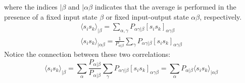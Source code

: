 where the indices $|\beta$ and $|\alpha\beta$ indicates that the average is performed in the presence of a fixed input state $\beta$ or fixed input-output state $\alpha\beta$, respectively.
\begin{gather}
{\langle s_is_k\rangle}_{|\beta}=\sum_{\alpha,\gamma}P_{\alpha\gamma|\beta}{[s_is_k]}_{\alpha\gamma\beta}\\%
{\langle s_is_k\rangle}_{|\alpha\beta}=\frac{1}{P_{\alpha|\beta}}\sum_{\gamma}P_{\alpha\gamma|\beta}{[s_is_k]}_{\alpha\gamma\beta}%
\end{gather}
Notice the connection between these two correlations:
\begin{equation}
{\langle s_is_k\rangle}_{|\beta}=\sum_\alpha\frac{P_{\alpha|\beta}}{P_{\alpha|\beta}}\sum_\gamma P_{\alpha\gamma|\beta}{[s_is_k]}_{\alpha\gamma\beta}=\sum_\alpha P_{\alpha|\beta}{\langle s_is_k\rangle}_{|\alpha\beta}
\end{equation}

